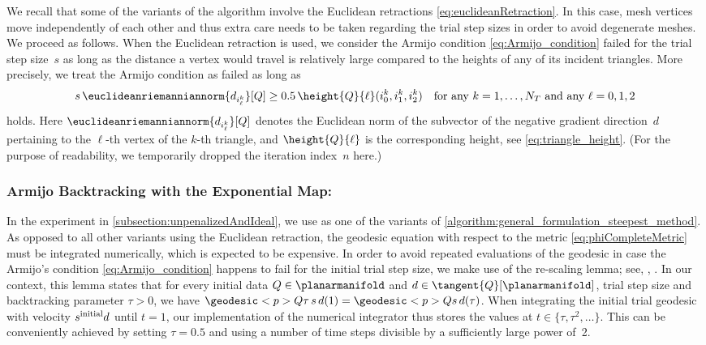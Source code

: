 We recall that some of the variants of the algorithm involve the Euclidean retractions \eqref{eq:euclideanRetraction}.
In this case, mesh vertices move independently of each other and thus extra care needs to be taken regarding the trial step sizes in order to avoid degenerate meshes.
We proceed as follows.
When the Euclidean retraction is used, we consider the Armijo condition \eqref{eq:Armijo_condition} failed for the trial step size~$s$ as long as the distance a vertex would travel is relatively large compared to the heights of any of its incident triangles.
More precisely, we treat the Armijo condition as failed as long as
\begin{equation}
	\label{eq:modified_initial_s_euclidean_retraction}
	s \, \euclideanriemanniannorm{d_{i^k_\ell}}[Q]
	\ge
	0.5 \, \height{Q}{\ell}(i^k_0,i^k_1,i^k_2)
	\quad
	\text{for any $k=1,\ldots,N_T$ and any $\ell = 0,1,2$}
\end{equation}
holds.
Here $\euclideanriemanniannorm{d_{i^k_\ell}}[Q]$ denotes the Euclidean norm of the subvector of the negative gradient direction~$d$ pertaining to the $\ell$-th vertex of the $k$-th triangle, and $\height{Q}{\ell}$ is the corresponding height, see \eqref{eq:triangle_height}.
(For the purpose of readability, we temporarily dropped the iteration index~$n$ here.)


\subsubsection*{Armijo Backtracking with the Exponential Map:}
In the experiment in \cref{subsection:unpenalizedAndIdeal}, we use \CompComp as one of the variants of \cref{algorithm:general_formulation_steepest_method}.
As opposed to all other variants using the Euclidean retraction, the geodesic equation with respect to the metric \eqref{eq:phiCompleteMetric} must be integrated numerically, which is expected to be expensive.
In order to avoid repeated evaluations of the geodesic in case the Armijo's condition \eqref{eq:Armijo_condition} happens to fail for the initial trial step size, we make use of the re-scaling lemma; see, \eg, \cite[Lemma~5.18, p.127]{Lee:2018:1}.
In our context, this lemma states that for every initial data $Q\in\planarmanifold$ and $d\in \tangent{Q}[\planarmanifold]$, trial step size and backtracking parameter $\tau > 0$, we have $\geodesic<p>{Q}{\tau \, s \, d}(1) = \geodesic<p>{Q}{s \, d}(\tau)$.
When integrating the initial trial geodesic with velocity $s^\textup{initial} d$ until $t = 1$, our implementation of the numerical integrator thus stores the values at $t \in \{\tau, \tau^2, \ldots\}$.
This can be conveniently achieved by setting $\tau = 0.5$ and using a number of time steps divisible by a sufficiently large power of~2.

